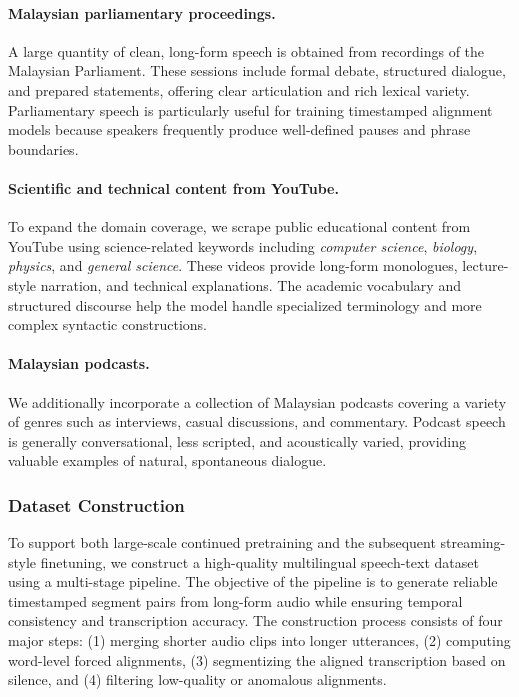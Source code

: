 \documentclass{article}
\begin{document}
\paragraph{Malaysian parliamentary proceedings.}
A large quantity of clean, long-form speech is obtained from recordings of the Malaysian Parliament. These sessions include formal debate, structured dialogue, and prepared statements, offering clear articulation and rich lexical variety. Parliamentary speech is particularly useful for training timestamped alignment models because speakers frequently produce well-defined pauses and phrase boundaries.

\paragraph{Scientific and technical content from YouTube.}
To expand the domain coverage, we scrape public educational content from YouTube using science-related keywords including \textit{computer science}, \textit{biology}, \textit{physics}, and \textit{general science}. These videos provide long-form monologues, lecture-style narration, and technical explanations. The academic vocabulary and structured discourse help the model handle specialized terminology and more complex syntactic constructions.

\paragraph{Malaysian podcasts.}
We additionally incorporate a collection of Malaysian podcasts covering a variety of genres such as interviews, casual discussions, and commentary. Podcast speech is generally conversational, less scripted, and acoustically varied, providing valuable examples of natural, spontaneous dialogue.

\subsubsection{Dataset Construction}

To support both large-scale continued pretraining and the subsequent streaming-style finetuning, we construct a high-quality multilingual speech-text dataset using a multi-stage pipeline. The objective of the pipeline is to generate reliable timestamped segment pairs from long-form audio while ensuring temporal consistency and transcription accuracy. The construction process consists of four major steps: (1) merging shorter audio clips into longer utterances, (2) computing word-level forced alignments, (3) segmentizing the aligned transcription based on silence, and (4) filtering low-quality or anomalous alignments.
\end{document}
